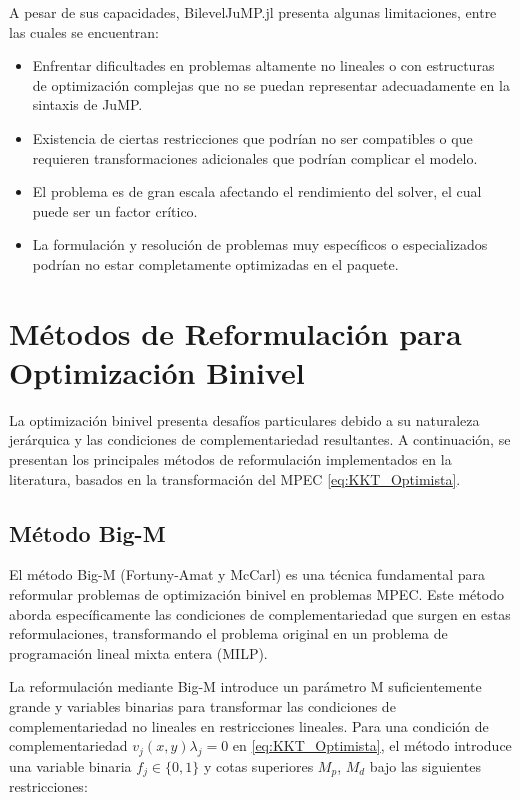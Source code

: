 
A pesar de sus capacidades, BilevelJuMP.jl presenta algunas limitaciones, entre las cuales se encuentran:

\begin{itemize}
    \item Enfrentar dificultades en problemas altamente no lineales o con estructuras de optimización complejas que no se puedan representar adecuadamente en la sintaxis de JuMP.
    \item Existencia de ciertas restricciones que podrían no ser compatibles o que requieren transformaciones adicionales que podrían complicar el modelo.
    \item El problema es de gran escala afectando el rendimiento del solver, el cual puede ser un factor crítico.
    \item La formulación y resolución de problemas muy específicos o especializados podrían no estar completamente optimizadas en el paquete.
\end{itemize}


\section{Métodos de Reformulación para Optimización Binivel}
La optimización binivel presenta desafíos particulares debido a su naturaleza jerárquica y las condiciones de complementariedad resultantes. A continuación, se presentan los principales métodos de reformulación implementados en la literatura, basados en la transformación del MPEC \eqref{eq:KKT_Optimista}.
\subsection{Método Big-M}

El método Big-M (Fortuny-Amat y McCarl)  es una técnica fundamental para reformular problemas de optimización binivel en problemas MPEC. 
Este método aborda específicamente las condiciones de complementariedad que surgen en estas reformulaciones, transformando el problema original en un problema de programación lineal mixta entera (MILP).

La reformulación mediante Big-M introduce un parámetro M suficientemente grande y variables binarias para transformar las condiciones de complementariedad no lineales en restricciones lineales. Para una condición de complementariedad 
$v_j(x,y)\lambda_j = 0$ en \eqref{eq:KKT_Optimista}, el método introduce una variable binaria  $f_j \in \{0,1\}$ y cotas superiores $M_p$, $M_d$ bajo  las siguientes restricciones:

